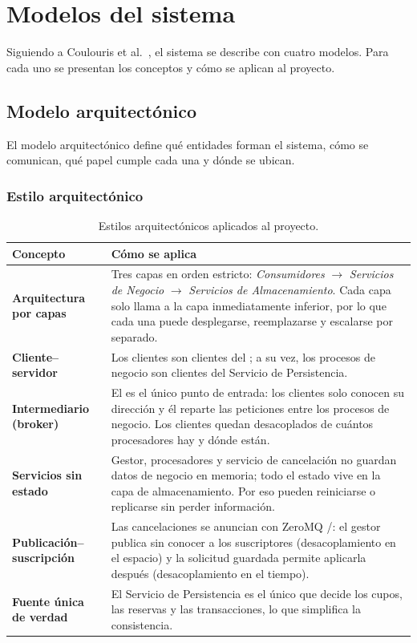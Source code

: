 \section{Modelos del sistema}
\label{sec:modelos}

Siguiendo a Coulouris et al.~\cite{coulouris}, el sistema se describe con cuatro
modelos. Para cada uno se presentan los conceptos y cómo se aplican al proyecto.

\subsection{Modelo arquitectónico}

El modelo arquitectónico define qué entidades forman el sistema, cómo se comunican,
qué papel cumple cada una y dónde se ubican.

\subsubsection{Estilo arquitectónico}

\begin{table}[H]
\centering
\caption{Estilos arquitectónicos aplicados al proyecto.}
\begin{tabularx}{\textwidth}{>{\bfseries}p{3.6cm}Y}
\toprule
Concepto & Cómo se aplica \\
\midrule
Arquitectura por capas &
Tres capas en orden estricto: \emph{Consumidores} $\rightarrow$ \emph{Servicios de
Negocio} $\rightarrow$ \emph{Servicios de Almacenamiento}. Cada capa solo llama a la
capa inmediatamente inferior, por lo que cada una puede desplegarse, reemplazarse y
escalarse por separado. \\
Cliente--servidor &
Los clientes son clientes del ; a su vez, los procesos
de negocio son clientes del Servicio de Persistencia. \\
Intermediario (broker) &
El  es el único punto de entrada: los clientes solo
conocen su dirección y él reparte las peticiones entre los procesos de negocio. Los
clientes quedan desacoplados de cuántos procesadores hay y dónde están. \\
Servicios sin estado &
Gestor, procesadores y servicio de cancelación no guardan datos de negocio en
memoria; todo el estado vive en la capa de almacenamiento. Por eso pueden
reiniciarse o replicarse sin perder información. \\
Publicación--suscripción &
Las cancelaciones se anuncian con ZeroMQ /: el gestor
publica sin conocer a los suscriptores (desacoplamiento en el espacio) y la
solicitud guardada permite aplicarla después (desacoplamiento en el tiempo). \\
Fuente única de verdad &
El Servicio de Persistencia es el único que decide los cupos, las reservas y las
transacciones, lo que simplifica la consistencia. \\
\bottomrule
\end{tabularx}
\end{table}

